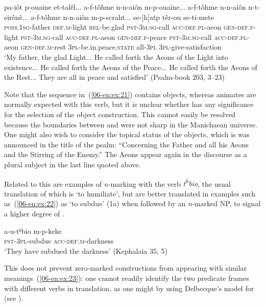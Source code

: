 \documentclass[output=paper]{LSP/langsci}
\begin{document}
\begin{exe}
\ex \label{06-en:ex:21}
\gll pa-iôt 	p-ouaine 	et-talêl... a-f-tôhme 	n-n-aiôn 	m-p-ouaine...
	a-f-tôhme 	n-n-aiôn 	n-t-eirênê... 	a-f-tôhme 	n-n-aiôn 	m-p-scraht... 	se-[h]atp 		têr-ou 	se-ti-mete\\
	\textsc{poss.1sg-}father \textsc{def.m-}light \textsc{rel-}be.glad \textsc{pst-3m.sg-}call \textsc{acc-def.pl-}aeon \textsc{gen-}\textsc{def.f-}light \textsc{pst-3m.sg-}call \textsc{acc-def.pl-}aeon \textsc{gen-}\textsc{def.f-}peace \textsc{pst-3m.sg-}call \textsc{acc-def.pl-}aeon \textsc{gen-}\textsc{def.m-}rest  \textsc{3pl-}be.in.peace.\textsc{state} all-\textsc{3pl} \textsc{3pl-}give-satisfaction\\
\glt ‘My father, the glad Light... He called forth the Aeons of the Light into existence... He called forth the Aeons of the Peace... He called forth the Aeons of the Rest... They are all in peace and satisfied’ (Psalm-book 203, 3–23) 
\end{exe}

Note that the sequence in~(\ref{06-en:ex:21}) contains  objects, whereas animates are normally expected with this verb, but it is unclear whether  has any significance for the selection of the object construction. This cannot easily be resolved because the boundaries between  and  were not sharp in the Manichaean universe. One might also wish to consider the topical status of the objects, which is was announced in the title of the psalm: “Concerning the Father and all his Aeons and the Stirring of the Enemy.” The Aeons appear again in the discourse as a plural subject in the last line quoted above.

Related to this are examples of \textit{n-}marking with the verb \textit{t}\textit{\textsuperscript{h}}\textit{bio}, the usual translation of which is ‘to humiliate’, but are better translated in examples such as~(\ref{06-en:ex:22}) as ‘to subdue’ (\cf 1a) when followed by an \textit{n-}marked NP, to signal a higher degree of . 

\begin{exe}
\ex \label{06-en:ex:22}
\gll a-u-tʰbio 			m-p-keke\\
	\textsc{pst-3pl-}subdue \textsc{acc-def.m-}darkness\\
\glt ‘They have subdued the darkness’ (Kephalaia 35, 5)
\end{exe}

This does not prevent zero-marked constructions from appearing with similar meanings~(\ref{06-en:ex:23}): one cannot readily identify the two  predicate frames with different verbs in translation, as one might by using Delbecque’s model for  (see ). 
\end{document}
